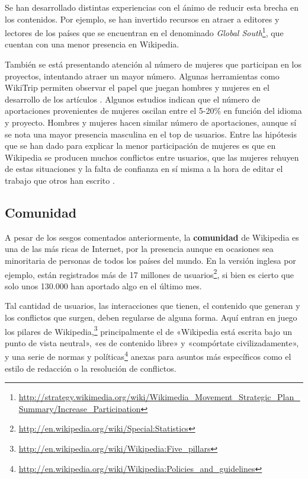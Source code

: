 \documentclass[11pt,onecolumn]{article}
\begin{document}

Se han desarrollado distintas experiencias con el ánimo de reducir esta brecha en los contenidos. Por ejemplo, se han invertido recursos en atraer a editores y lectores de los países que se encuentran en el denominado \emph{Global South}\footnote{\href{http://strategy.wikimedia.org/wiki/Wikimedia_Movement_Strategic_Plan_Summary/Increase_Participation}{http://strategy.wikimedia.org/wiki/Wikimedia\_Movement\_Strategic\_Plan\_Summary/Increase\_Participation}}, que cuentan con una menor presencia en Wikipedia.


También se está presentando atención al número de mujeres que participan en los proyectos, intentando atraer un mayor número. Algunas herramientas como WikiTrip permiten observar el papel que juegan hombres y mujeres en el desarrollo de los artículos \citep{massa2011}. Algunos estudios indican que el número de aportaciones provenientes de mujeres oscilan entre el 5-20\% en función del idioma y proyecto. Hombres y mujeres hacen similar número de aportaciones, aunque sí se nota una mayor presencia masculina en el top de usuarios.\citep{antin2011} Entre las hipótesis que se han dado para explicar la menor participación de mujeres es que en Wikipedia se producen muchos conflictos entre usuarios, que las mujeres rehuyen de estas situaciones y la falta de confianza en sí misma a la hora de editar el trabajo que otros han escrito \citep{collier2012}.


\subsection{Comunidad}


A pesar de los sesgos comentados anteriormente, la \textbf{comunidad} de Wikipedia es una de las más ricas de Internet, por la presencia aunque en ocasiones sea minoritaria de personas de todos los países del mundo. En la versión inglesa por ejemplo, están registrados más de 17 millones de usuarios\footnote{\href{http://en.wikipedia.org/wiki/Special:Statistics}{http://en.wikipedia.org/wiki/Special:Statistics}}, si bien es cierto que solo unos 130.000 han aportado algo en el último mes.

Tal cantidad de usuarios, las interacciones que tienen, el contenido que generan y los conflictos que surgen, deben regularse de alguna forma. Aquí entran en juego los pilares de Wikipedia,\footnote{\href{http://en.wikipedia.org/wiki/Wikipedia:Five_pillars}{http://en.wikipedia.org/wiki/Wikipedia:Five\_pillars}} principalmente el de «Wikipedia está escrita bajo un punto de vista neutral», «es de contenido libre» y «compórtate civilizadamente», y una serie de normas y políticas\footnote{\href{http://en.wikipedia.org/wiki/Wikipedia:Policies_and_guidelines}{http://en.wikipedia.org/wiki/Wikipedia:Policies\_and\_guidelines}} anexas para asuntos más específicos como el estilo de redacción o la resolución de conflictos.
\end{document}
